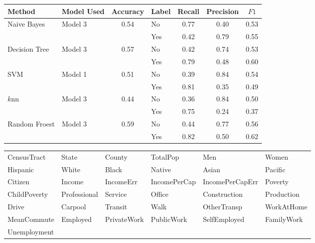 \documentclass{article}
\begin{document}
		
\begin{table}
	\centering
	\begin{tabular}{|l|l|c|l|c|c|c|}\hline
		Method&Model Used&Accuracy&Label&Recall&Precision&$F1$\\\hline
		Naive Bayes		&Model 3&0.54	&No		&0.77	&0.40	&0.53\\\cline{4-7}
						&		&		&Yes	&0.42	&0.79	&0.55\\\hline
		Decision Tree 	&Model 3&0.57  	&No		&0.42	&0.74	&0.53\\\cline{4-7}
						&		&		&Yes	&0.79	&0.48	&0.60\\\hline
		SVM				&Model 1&0.51	&No		&0.39	&0.84	&0.54\\\cline{4-7}
						&		&		&Yes	&0.81	&0.35	&0.49\\\hline
		$k$nn			&Model 3&0.44	&No		&0.36	&0.84	&0.50\\\cline{4-7}
						&		&		&Yes	&0.75	&0.24	&0.37\\\hline
		Random Froest	&Model 3&0.59	&No		&0.44	&0.77	&0.56\\\cline{4-7}
						&		&		&Yes	&0.82	&0.50	&0.62\\\hline
		\end{tabular}
\end{table}


\begin{table}[h]
	\centering
	\begin{tabular}{llllll}\hline
		CensusTract	&State			&County		&TotalPop		&Men			&Women\\
		Hispanic	&White			&Black		&Native			&Asian			&Pacific\\
		Citizen		&Income			&IncomeErr	&IncomePerCap	&IncomePerCapErr&Poverty\\
		ChildPoverty&Professional	&Service	&Office			&Construction	&Production\\
		Drive		&Carpool		&Transit	&Walk			&OtherTransp	&WorkAtHome\\
		MeanCommute	&Employed		&PrivateWork&PublicWork		&SelfEmployed	&FamilyWork\\
		Unemployment\\\hline
	\end{tabular}
\end{table}
\end{document}

